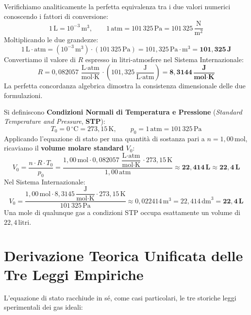 \documentclass[11pt,a4paper,oneside]{report}
\begin{document}
\begin{metodo}
Verifichiamo analiticamente la perfetta equivalenza tra i due valori numerici conoscendo i fattori di conversione:
\[
1\,\text{L} = 10^{-3}\,\text{m}^3, \qquad 1\,\text{atm} = 101\,325\,\text{Pa} = 101\,325\,\frac{\text{N}}{\text{m}^2}
\]
Moltiplicando le due grandezze:
\[
1\,\text{L}\cdot\text{atm} = (10^{-3}\,\text{m}^3) \cdot (101\,325\,\text{Pa}) = 101{,}325\,\text{Pa}\cdot\text{m}^3 = \mathbf{101{,}325\,\text{J}}
\]
Convertiamo il valore di $R$ espresso in litri-atmosfere nel Sistema Internazionale:
\[
R = 0{,}082057\,\frac{\text{L}\cdot\text{atm}}{\text{mol}\cdot\text{K}} \cdot \left(101{,}325\,\frac{\text{J}}{\text{L}\cdot\text{atm}}\right) = \mathbf{8{,}3144\,\frac{\text{J}}{\text{mol}\cdot\text{K}}}
\]
La perfetta concordanza algebrica dimostra la consistenza dimensionale delle due formulazioni.
\end{metodo}

\begin{definizione}
Si definiscono \textbf{Condizioni Normali di Temperatura e Pressione} (\textit{Standard Temperature and Pressure}, \textbf{STP}):
\[
T_0 = 0\,^\circ\text{C} = 273{,}15\,\text{K}, \qquad p_0 = 1\,\text{atm} = 101\,325\,\text{Pa}
\]
Applicando l'equazione di stato per una quantit\`a di sostanza pari a $n = 1{,}00\,\text{mol}$, ricaviamo il \textbf{volume molare standard} $V_0$:
\[
V_0 = \frac{n \cdot R \cdot T_0}{p_0} = \frac{1{,}00\,\text{mol} \cdot 0{,}082057\,\dfrac{\text{L}\cdot\text{atm}}{\text{mol}\cdot\text{K}} \cdot 273{,}15\,\text{K}}{1{,}00\,\text{atm}} \approx \mathbf{22{,}414\,\text{L} \approx 22{,}4\,\text{L}}
\]
Nel Sistema Internazionale:
\[
V_0 = \frac{1{,}00\,\text{mol} \cdot 8{,}3145\,\dfrac{\text{J}}{\text{mol}\cdot\text{K}} \cdot 273{,}15\,\text{K}}{101\,325\,\text{Pa}} \approx 0{,}022414\,\text{m}^3 = 22{,}414\,\text{dm}^3 = \mathbf{22{,}4\,\text{L}}
\]
Una mole di qualunque gas a condizioni STP occupa esattamente un volume di $22{,}4\,\text{litri}$.
\end{definizione}

\section{Derivazione Teorica Unificata delle Tre Leggi Empiriche}

L'equazione di stato racchiude in s\'e, come casi particolari, le tre storiche leggi sperimentali dei gas ideali:
\end{document}
